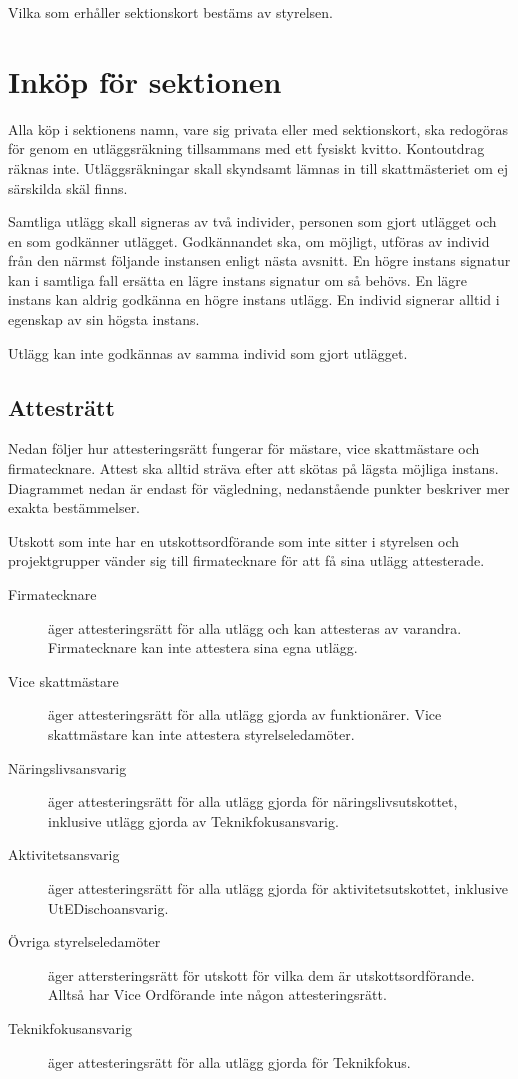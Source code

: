 \documentclass{dsekprotokoll}
\begin{document}
Vilka som erhåller sektionskort bestäms av styrelsen.

\section{Inköp för sektionen}
Alla köp i sektionens namn, vare sig privata eller med sektionskort, ska
redogöras för genom en utläggsräkning tillsammans med ett fysiskt
kvitto. Kontoutdrag räknas inte. Utläggsräkningar skall skyndsamt lämnas in till
skattmästeriet om ej särskilda skäl finns.

Samtliga utlägg skall signeras av två individer, personen som gjort utlägget och
en som godkänner utlägget. Godkännandet ska, om möjligt, utföras av individ
från den närmst följande instansen enligt nästa avsnitt. En högre instans
signatur kan i samtliga fall ersätta en lägre instans signatur om så
behövs. En lägre instans kan aldrig godkänna en högre instans utlägg. En individ
signerar alltid i egenskap av sin högsta instans.

Utlägg kan inte godkännas av samma individ som gjort utlägget.

\subsection{Attesträtt}
Nedan följer hur attesteringsrätt fungerar för mästare, vice skattmästare och
firmatecknare.  Attest ska alltid sträva efter att skötas på lägsta möjliga
instans. Diagrammet nedan är endast för vägledning, nedanstående punkter
beskriver mer exakta bestämmelser.

Utskott som inte har en utskottsordförande som inte sitter i styrelsen och
projektgrupper vänder sig till firmatecknare för att få sina utlägg
attesterade.

\begin{description}
  \item[Firmatecknare] äger attesteringsrätt för alla utlägg och kan attesteras
    av varandra. Firmatecknare kan inte attestera sina egna utlägg.
  \item[Vice skattmästare] äger attesteringsrätt för alla utlägg gjorda av
    funktionärer. Vice skattmästare kan inte attestera styrelseledamöter.
  \item[Näringslivsansvarig] äger attesteringsrätt för alla utlägg gjorda för
    näringslivsutskottet, inklusive utlägg gjorda av Teknikfokusansvarig.
  \item[Aktivitetsansvarig] äger attesteringsrätt för alla utlägg gjorda för
    aktivitetsutskottet, inklusive UtEDischoansvarig.
  \item[Övriga styrelseledamöter] äger attersteringsrätt för utskott för vilka
    dem är utskottsordförande. Alltså har Vice Ordförande inte någon
    attesteringsrätt.
  \item[Teknikfokusansvarig] äger attesteringsrätt för alla utlägg gjorda för
    Teknikfokus.
\end{description}
\end{document}
